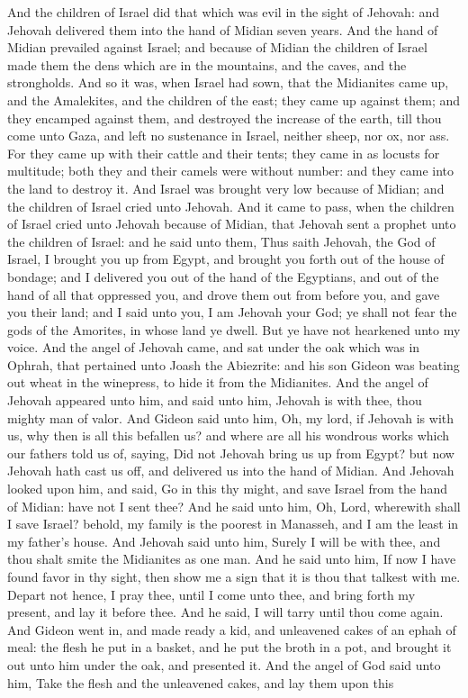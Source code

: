 And the children of Israel did that which was evil in the sight of Jehovah: and Jehovah delivered them into the hand of Midian seven years. And the hand of Midian prevailed against Israel; and because of Midian the children of Israel made them the dens which are in the mountains, and the caves, and the strongholds. And so it was, when Israel had sown, that the Midianites came up, and the Amalekites, and the children of the east; they came up against them; and they encamped against them, and destroyed the increase of the earth, till thou come unto Gaza, and left no sustenance in Israel, neither sheep, nor ox, nor ass. For they came up with their cattle and their tents; they came in as locusts for multitude; both they and their camels were without number: and they came into the land to destroy it. And Israel was brought very low because of Midian; and the children of Israel cried unto Jehovah.  And it came to pass, when the children of Israel cried unto Jehovah because of Midian, that Jehovah sent a prophet unto the children of Israel: and he said unto them, Thus saith Jehovah, the God of Israel, I brought you up from Egypt, and brought you forth out of the house of bondage; and I delivered you out of the hand of the Egyptians, and out of the hand of all that oppressed you, and drove them out from before you, and gave you their land; and I said unto you, I am Jehovah your God; ye shall not fear the gods of the Amorites, in whose land ye dwell. But ye have not hearkened unto my voice.  And the angel of Jehovah came, and sat under the oak which was in Ophrah, that pertained unto Joash the Abiezrite: and his son Gideon was beating out wheat in the winepress, to hide it from the Midianites. And the angel of Jehovah appeared unto him, and said unto him, Jehovah is with thee, thou mighty man of valor. And Gideon said unto him, Oh, my lord, if Jehovah is with us, why then is all this befallen us? and where are all his wondrous works which our fathers told us of, saying, Did not Jehovah bring us up from Egypt? but now Jehovah hath cast us off, and delivered us into the hand of Midian. And Jehovah looked upon him, and said, Go in this thy might, and save Israel from the hand of Midian: have not I sent thee? And he said unto him, Oh, Lord, wherewith shall I save Israel? behold, my family is the poorest in Manasseh, and I am the least in my father’s house. And Jehovah said unto him, Surely I will be with thee, and thou shalt smite the Midianites as one man. And he said unto him, If now I have found favor in thy sight, then show me a sign that it is thou that talkest with me. Depart not hence, I pray thee, until I come unto thee, and bring forth my present, and lay it before thee. And he said, I will tarry until thou come again.  And Gideon went in, and made ready a kid, and unleavened cakes of an ephah of meal: the flesh he put in a basket, and he put the broth in a pot, and brought it out unto him under the oak, and presented it. And the angel of God said unto him, Take the flesh and the unleavened cakes, and lay them upon this 